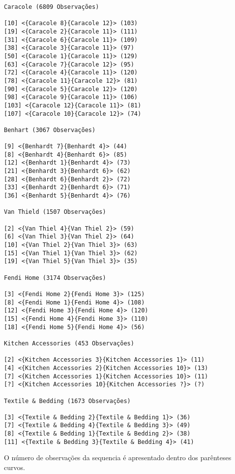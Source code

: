 \documentclass[a4paper]{article}
\begin{document}
\begin{lstlisting}
Caracole (6809 Observações)

[10] <{Caracole 8}{Caracole 12}> (103)
[19] <{Caracole 2}{Caracole 11}> (111)
[31] <{Caracole 6}{Caracole 11}> (109)
[38] <{Caracole 3}{Caracole 11}> (97)
[50] <{Caracole 1}{Caracole 11}> (129)
[63] <{Caracole 7}{Caracole 12}> (95)
[72] <{Caracole 4}{Caracole 11}> (120)
[78] <{Caracole 11}{Caracole 12}> (81)
[90] <{Caracole 5}{Caracole 12}> (120)
[98] <{Caracole 9}{Caracole 11}> (106)
[103] <{Caracole 12}{Caracole 11}> (81)
[107] <{Caracole 10}{Caracole 12}> (74)

Benhart (3067 Observações)

[9] <{Benhardt 7}{Benhardt 4}> (44)
[8] <{Benhardt 4}{Benhardt 6}> (85)
[12] <{Benhardt 1}{Benhardt 4}> (73)
[21] <{Benhardt 3}{Benhardt 6}> (62)
[28] <{Benhardt 6}{Benhardt 2}> (72)
[33] <{Benhardt 2}{Benhardt 6}> (71)
[36] <{Benhardt 5}{Benhardt 4}> (76)

Van Thield (1507 Observações)

[2] <{Van Thiel 4}{Van Thiel 2}> (59)
[6] <{Van Thiel 3}{Van Thiel 2}> (64)
[10] <{Van Thiel 2}{Van Thiel 3}> (63)
[15] <{Van Thiel 1}{Van Thiel 3}> (62)
[19] <{Van Thiel 5}{Van Thiel 3}> (35)

Fendi Home (3174 Observações)

[3] <{Fendi Home 2}{Fendi Home 3}> (125)
[8] <{Fendi Home 1}{Fendi Home 4}> (108)
[12] <{Fendi Home 3}{Fendi Home 4}> (120)
[15] <{Fendi Home 4}{Fendi Home 3}> (110)
[18] <{Fendi Home 5}{Fendi Home 4}> (56)

Kitchen Accessories (453 Observações)

[2] <{Kitchen Accessories 3}{Kitchen Accessories 1}> (11)
[4] <{Kitchen Accessories 2}{Kitchen Accessories 10}> (13)
[7] <{Kitchen Accessories 1}{Kitchen Accessories 10}> (11)
[?] <{Kitchen Accessories 10}{Kitchen Accessories ?}> (?)

Textile & Bedding (1673 Observações)

[3] <{Textile & Bedding 2}{Textile & Bedding 1}> (36)
[7] <{Textile & Bedding 4}{Textile & Bedding 3}> (49)
[8] <{Textile & Bedding 1}{Textile & Bedding 2}> (38)
[11] <{Textile & Bedding 3}{Textile & Bedding 4}> (41)

\end{lstlisting}

O número de observações da sequencia é apresentado dentro dos parênteses curvos.\\
\end{document}
